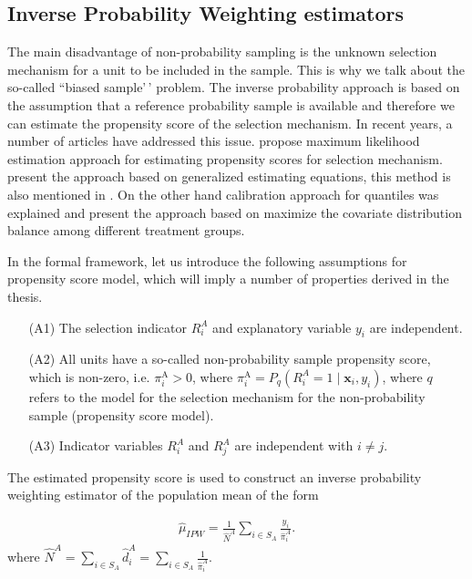 \documentclass[
]{jss}
\begin{document}
\subsection{Inverse Probability Weighting
estimators}\label{inverse-probability-weighting-estimators}

The main disadvantage of non-probability sampling is the unknown
selection mechanism for a unit to be included in the sample. This is why
we talk about the so-called ``biased sample'\,' problem. The inverse
probability approach is based on the assumption that a reference
probability sample is available and therefore we can estimate the
propensity score of the selection mechanism. In recent years, a number
of articles have addressed this issue. \cite{chen2020doubly} propose
maximum likelihood estimation approach for estimating propensity scores
for selection mechanism. \cite{wu2022statistical} present the approach
based on generalized estimating equations, this method is also mentioned
in \cite{yang_doubly_2020}. On the other hand calibration approach for
quantiles was explained \cite{beresewicz2024inference} and
\cite{santanna_covariate_2022} present the approach based on maximize
the covariate distribution balance among different treatment groups.

In the formal framework, let us introduce the following assumptions for
propensity score model, which will imply a number of properties derived
in the thesis.

\begin{itemize}
    \item[(A1)] The selection indicator $R_i^A$ and explanatory variable $y_i$ are independent.
    \item[(A2)]All units have a so-called non-probability sample propensity score, which is non-zero, i.e. $\pi_i^{\mathrm{A}} > 0$, where $\pi_i^{\mathrm{A}} = P_q\left(R_i^A=1 \mid \boldsymbol{x}_i, y_i\right)$, where $q$ refers to the model for the selection mechanism for the non-probability sample (propensity score model).
    \item[(A3)] Indicator variables $R_i^A$ and $R_j^A$ are independent with $i \neq j$. 
\end{itemize}

The estimated propensity score is used to construct an inverse
probability weighting estimator of the population mean of the form

\begin{equation}
\begin{gathered}
\hat{\mu}_{I P W}=\frac{1}{\hat{N}^A} \sum_{i \in S_A} \frac{y_i}{\hat{\pi}_i^A}.
\end{gathered}
\end{equation} where
\(\hat{N}^A = \sum_{i \in S_A} \hat{d}_i^A = \sum_{i \in S_A} \frac{1}{\hat{\pi}_i^A}\).
\end{document}
